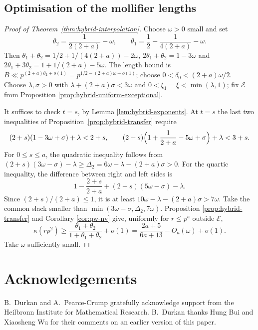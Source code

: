 \documentclass[12pt, a4paper]{amsart}
\numberwithin{equation}{section}
\renewcommand{\le}{\leqslant}
\renewcommand{\ge}{\geqslant}
\theoremstyle{plain}
\begin{document}
\subsection{Optimisation of the mollifier lengths}

\begin{proof}[Proof of Theorem~\ref{thm:hybrid-interpolation}]
Choose $\omega>0$ small and set
$$
\theta_2=\frac{1}{2(2+a)}-\omega,\qquad
\theta_1=\frac{1}{2}-\frac{1}{4(2+a)}-\omega.
$$
Then $\theta_1+\theta_2=1/2+1/(4(2+a))-2\omega$, $2\theta_1+\theta_2=1-3\omega$ and $2\theta_1+3\theta_2=1+1/(2+a)-5\omega$. The length bound is $B\ll p^{(2+a)\theta_2+o(1)}=p^{1/2-(2+a)\omega+o(1)}$; choose $0<\delta_0<(2+a)\omega/2$. Choose $\lambda,\sigma>0$ with $\lambda+(2+a)\sigma<3\omega$ and $0<\xi_1=\xi<\min(\lambda,1)$; fix $\mathcal E$ from Proposition \ref{prop:hybrid-uniform-exceptional}.

It suffices to check $t=s$, by Lemma \ref{lem:hybrid-exponents}. At $t=s$ the last two inequalities of Proposition~\ref{prop:hybrid-transfer} require
$$
(2+s)(1-3\omega+\sigma)+\lambda<2+s,
\qquad
(2+s)\Bigl(1+\frac1{2+a}-5\omega+\sigma\Bigr)+\lambda<3+s.
$$
 For $0\le s\le a$, the quadratic inequality follows from $(2+s)(3\omega-\sigma)-\lambda\ge{\Delta_2=6\omega-\lambda-(2+a)\sigma>0}$. For the quartic inequality, the difference between right and left sides is
$$
1-\frac{2+s}{2+a}+(2+s)(5\omega-\sigma)-\lambda.
$$
Since $(2+s)/(2+a)\le1$, it is at least $10\omega-\lambda-(2+a)\sigma>7\omega$. Take the common slack smaller than $\min(3\omega-\sigma,\Delta_2,7\omega)$. Proposition \ref{prop:hybrid-transfer} and Corollary \ref{cor:qw-nv} give, uniformly for $r\le p^a$ outside $\mathcal E$,
$$
\kappa(rp^2)\ge
\frac{\theta_1+\theta_2}{1+\theta_1+\theta_2}+o(1)
=
\frac{2a+5}{6a+13}-O_a(\omega)+o(1).
$$
Take $\omega$ sufficiently small.
\end{proof}

\section*{Acknowledgements}

B.~Durkan and A.~Pearce-Crump gratefully acknowledge support from the Heilbronn Institute for Mathematical Research. B.~Durkan thanks Hung Bui and Xiaosheng Wu for their comments on an earlier version of this paper.
\end{document}
